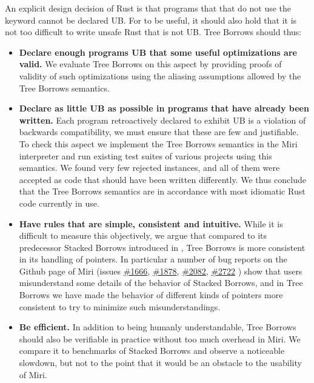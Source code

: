 \documentclass[a4paper,11pt]{article}
\theoremstyle{plain}
\theoremstyle{definition}
\theoremstyle{remark}
\newcommand{\tcode}[1]{\rstinline{#1}}
\begin{document}
An explicit design decision of Rust is that programs that that do not use the
\tcode{unsafe} keyword cannot be declared UB. For \tcode{unsafe} to be useful,
it should also hold that it is not too difficult to write unsafe Rust that is not
UB. Tree Borrows should thus:
\begin{itemize}
    \item \textbf{Declare enough programs UB that some useful optimizations are valid.}
        We evaluate Tree Borrows on this aspect by providing proofs of validity of such
        optimizations using the aliasing assumptions allowed by the Tree Borrows semantics.
    \item \textbf{Declare as little UB as possible in programs that have already been written.}
        Each program retroactively declared to exhibit UB is a violation of backwards compatibility,
        we must ensure that these are few and justifiable.
        To check this aspect we implement the Tree Borrows semantics in the Miri
        interpreter and run existing test suites of various projects using this semantics.
        We found very few rejected instances, and all of them were accepted as
        code that should have been written differently. We thus conclude that the Tree Borrows
        semantics are in accordance with most idiomatic Rust code currently in use.
    \item \textbf{Have rules that are simple, consistent and intuitive.}
        While it is difficult to measure this objectively, we argue that compared
        to its predecessor Stacked Borrows introduced in \cite{stacked_borrows},
        Tree Borrows is more consistent in its handling of pointers. In particular
        a number of bug reports on the Github page of Miri \cite{miri} (issues
        \href{https://github.com/rust-lang/miri/issues/1666}{\#1666},
        \href{https://github.com/rust-lang/miri/issues/1878}{\#1878},
        \href{https://github.com/rust-lang/miri/issues/2082}{\#2082},
        \href{https://github.com/rust-lang/miri/issues/2722}{\#2722}
        ) show that users misunderstand some details of the behavior of Stacked Borrows,
        and in Tree Borrows we have made the behavior of different kinds of pointers
        more consistent to try to minimize such misunderstandings.
    \item \textbf{Be efficient.} In addition to being humanly understandable, Tree Borrows
        should also be verifiable in practice without too much overhead in Miri.
        We compare it to benchmarks of Stacked Borrows and observe a noticeable slowdown,
        but not to the point that it would be an obstacle to the usability of Miri.
\end{itemize}
\end{document}
